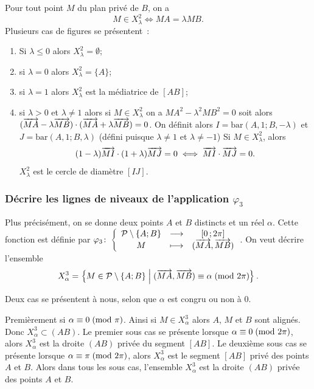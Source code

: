 Pour tout point \(M\) du plan privé de \(B\), on a
\begin{equation}
  M \in X_{\lambda}^2 \iff MA = \lambda MB.
\end{equation}
Plusieurs cas de figures se présentent~:
\begin{enumerate}
  \item Si \(\lambda \leqslant 0\) alors \(X_{\lambda}^2 = \emptyset\);
  \item si \(\lambda = 0\) alors \(X_{\lambda}^2 = \{A\}\);
  \item si \(\lambda = 1\) alors \(X_{\lambda}^2\) est la médiatrice de
    \([AB]\);
  \item si \(\lambda > 0\) et \(\lambda \neq 1\) alors si \(M \in
    X_{\lambda}^2\) on a \(MA^2 - \lambda^2 MB^2 = 0\) soit alors
    \((\overrightarrow{MA}-\lambda \overrightarrow{MB}) \cdot (\overrightarrow{MA} + \lambda
    \overrightarrow{MB}) = 0\). On définit alors \(I = \text{bar}(A , 1;B ,
    -\lambda)\) et \(J = \text{bar}(A , 1;B , \lambda)\) (défini puisque
    \(\lambda \neq 1\) et \(\lambda \neq -1\))
    Si \(M \in X_{\lambda}^2\), alors
    \begin{equation}
      (1 - \lambda) \overrightarrow{MI} \cdot (1 + \lambda) \overrightarrow{MJ} = 0 \iff
    \overrightarrow{MI} \cdot \overrightarrow{MJ} = 0.  \end{equation}
    \(X_{\lambda}^2\) est le cercle de diamètre \([IJ]\).
\end{enumerate}

\subsubsection{Décrire les lignes de niveaux de l'application
\(\varphi_3\)}

Plus précisément, on se donne deux points \(A\) et \(B\) distincts et un
réel \(\alpha\). Cette fonction est définie par
\(\varphi_3\colon\left\{\begin{array}{ccc}\mathcal{P}\setminus\{A;B\} & \longrightarrow &\left[ 0 \, ; {} 2\pi \right]\\M & \longmapsto & (\overrightarrow{MA},
\overrightarrow{MB})\end{array}\right.\). On veut décrire l'ensemble
\begin{equation}
  X_{\alpha}^3 = \left\{M \in
  \mathcal{P}\setminus\{A;B\}\mathrel{}\middle|\mathrel{}(\overrightarrow{MA},\overrightarrow{MB}) \equiv \alpha\!\pmod {2\pi}\right\}.
\end{equation}

Deux cas se présentent à nous, selon que \(\alpha\) est congru ou non à 0.

Premièrement si \(\alpha \equiv 0\!\pmod {\pi}\). Ainsi si \(M \in X_\alpha^3\)
alors \(A\), \(M\) et \(B\) sont alignés. Donc \(X_\alpha^3 \subset (AB)\). Le
premier sous cas se présente lorsque \(\alpha \equiv 0\!\pmod {2\pi}\), alors
\(X_\alpha^3\) est la droite \((AB)\) privée du segment \([AB]\). Le deuxième
sous cas se présente lorsque \(\alpha \equiv \pi\!\pmod {2\pi}\), alors
\(X_\alpha^3\) est le segment \([AB]\) privé des points \(A\) et \(B\).  Alors
dans tous les sous cas, l'ensemble \(X_\alpha^3\) est la droite \((AB)\)
privée des points \(A\) et \(B\).

